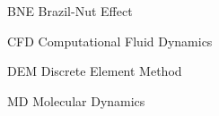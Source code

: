 
\begin{siglas}
    \item[BNE] Brazil-Nut Effect
    \item[CFD] Computational Fluid Dynamics
    \item[DEM] Discrete Element Method
    \item[MD] Molecular Dynamics
\end{siglas}

